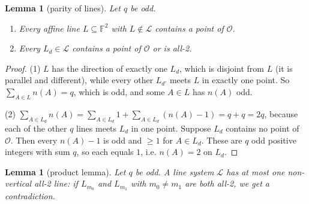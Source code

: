 \documentclass[11pt,a4paper]{article}
\newtheorem{lemma}[theorem]{Lemma}
\theoremstyle{definition}
\theoremstyle{remark}
\newcommand{\F}{\mathbb{F}}
\newcommand{\Lset}{\mathcal{L}}
\newcommand{\Oset}{\mathcal{O}}
\begin{document}
\begin{lemma}[parity of lines]\label{lem:parity}
Let $q$ be odd.
\begin{enumerate}
\item Every affine line $L\subseteq\F^2$ with $L\notin\Lset$ contains a point of $\Oset$.
\item Every $L_d\in\Lset$ contains a point of $\Oset$ or is all-2.
\end{enumerate}
\end{lemma}

\begin{proof}
(1) $L$ has the direction of exactly one $L_d$, which is disjoint from $L$ (it is parallel and
different), while every other $L_{d'}$ meets $L$ in exactly one point. So $\sum_{A\in L}n(A)=q$,
which is odd, and some $A\in L$ has $n(A)$ odd.

(2) $\sum_{A\in L_d}n(A)=\sum_{A\in L_d}1+\sum_{A\in L_d}(n(A)-1)=q+q=2q$, because each of the other
$q$ lines meets $L_d$ in one point. Suppose $L_d$ contains no point of $\Oset$. Then every
$n(A)-1$ is odd and $\ge1$ for $A\in L_d$. These are $q$ odd positive integers with sum $q$, so each
equals $1$, i.e. $n(A)=2$ on $L_d$.
\end{proof}

\begin{lemma}[product lemma]\label{lem:product}
Let $q$ be odd. A line system $\Lset$ has at most one non-vertical all-2 line: if $L_{m_0}$ and
$L_{m_1}$ with $m_0\ne m_1$ are both all-2, we get a contradiction.
\end{lemma}
\end{document}

